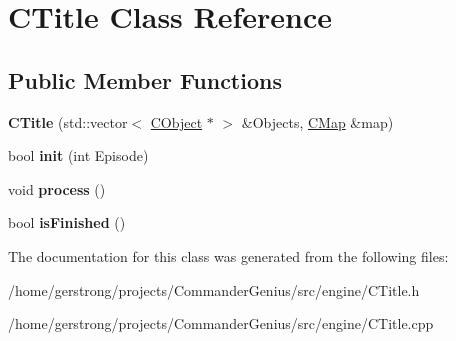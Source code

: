 \hypertarget{class_c_title}{
\section{CTitle Class Reference}
\label{class_c_title}
}
\subsection*{Public Member Functions}
\begin{DoxyCompactItemize}
\item 
\hypertarget{class_c_title_a3d06c7693d25379942bc5d77bd3c9688}{
{\bfseries CTitle} (std::vector$<$ \hyperlink{class_c_object}{CObject} $\ast$ $>$ \&Objects, \hyperlink{class_c_map}{CMap} \&map)}
\label{class_c_title_a3d06c7693d25379942bc5d77bd3c9688}

\item 
\hypertarget{class_c_title_a40af47eb7b4fe8f3880962554fa80576}{
bool {\bfseries init} (int Episode)}
\label{class_c_title_a40af47eb7b4fe8f3880962554fa80576}

\item 
\hypertarget{class_c_title_a2628f12fc30563d096f2ba62070b4be4}{
void {\bfseries process} ()}
\label{class_c_title_a2628f12fc30563d096f2ba62070b4be4}

\item 
\hypertarget{class_c_title_a1bdc1845b9a9022dc82f4729b0c6634e}{
bool {\bfseries isFinished} ()}
\label{class_c_title_a1bdc1845b9a9022dc82f4729b0c6634e}

\end{DoxyCompactItemize}


The documentation for this class was generated from the following files:\begin{DoxyCompactItemize}
\item 
/home/gerstrong/projects/CommanderGenius/src/engine/CTitle.h\item 
/home/gerstrong/projects/CommanderGenius/src/engine/CTitle.cpp\end{DoxyCompactItemize}
